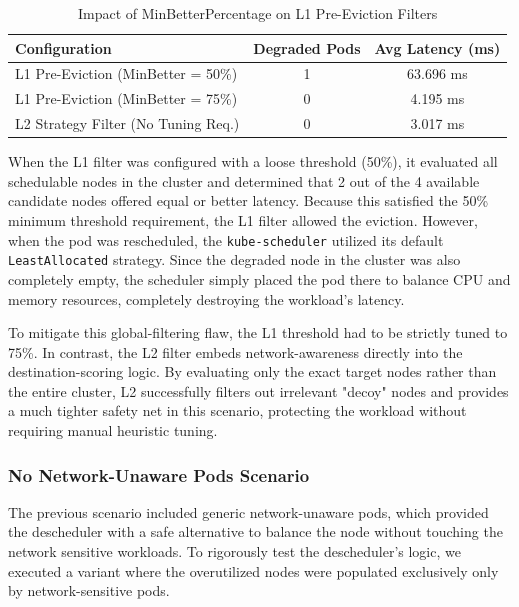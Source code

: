 \begin{table}[tbp]
    \centering
    \begin{tabular}{@{}l c c@{}}
        \toprule
        \textbf{Configuration} & \textbf{Degraded Pods} & \textbf{Avg Latency (ms)} \\
        \midrule
        L1 Pre-Eviction (MinBetter = 50\%) & 1 & 63.696 ms \\
        L1 Pre-Eviction (MinBetter = 75\%) & 0 & 4.195 ms\\
        \midrule
        L2 Strategy Filter (No Tuning Req.) & 0 & 3.017 ms\\
        \bottomrule
    \end{tabular}
    \caption{Impact of MinBetterPercentage on L1 Pre-Eviction Filters}
    \label{tab:minbetter_impact}
\end{table}

When the L1 filter was configured with a loose threshold (50\%), it evaluated all schedulable nodes in the cluster and determined that 2 out of the 4 available candidate nodes offered equal or better latency. Because this satisfied the 50\% minimum threshold requirement, the L1 filter allowed the eviction. However, when the pod was rescheduled, the \texttt{kube-scheduler} utilized its default \texttt{LeastAllocated} strategy. Since the degraded node in the cluster was also completely empty, the scheduler simply placed the pod there to balance CPU and memory resources, completely destroying the workload's latency.

To mitigate this global-filtering flaw, the L1 threshold had to be strictly tuned to 75\%. In contrast, the L2 filter embeds network-awareness directly into the destination-scoring logic. By evaluating only the exact target nodes rather than the entire cluster, L2 successfully filters out irrelevant "decoy" nodes and provides a much tighter safety net in this scenario, protecting the workload without requiring manual heuristic tuning.


\subsubsection{No Network-Unaware Pods Scenario}
\label{sec:no_filler_pods}

The previous scenario included generic network-unaware pods, which provided the descheduler with a safe alternative to balance the node without touching the network sensitive workloads. To rigorously test the descheduler's logic, we executed a variant where the overutilized nodes were populated exclusively only by network-sensitive pods.

